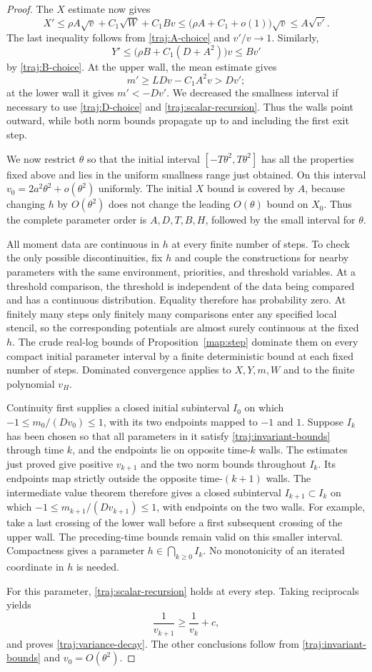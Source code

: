 \begin{proof}
The $X$ estimate now gives
\[
 X'\le\rho A\sqrt v+C_1\sqrt W+C_1Bv
     \le\bigl(\rho A+C_1+o(1)\bigr)\sqrt v
     \le A\sqrt{v'}.
\]
The last inequality follows from \eqref{traj:A-choice} and
$v'/v\to1$.  Similarly,
\[
 Y'\le\bigl(\rho B+C_1(D+A^2)\bigr)v\le Bv'
\]
by \eqref{traj:B-choice}.  At the upper wall, the mean estimate gives
\[
 m'\ge LDv-C_1A^2v>Dv';
\]
at the lower wall it gives $m'<-Dv'$.  We decreased the smallness
interval if necessary to use \eqref{traj:D-choice} and
\eqref{traj:scalar-recursion}.  Thus the walls point outward, while
both norm bounds propagate up to and including the first exit step.

We now restrict $\theta$ so that the initial interval
$[-T\theta^2,T\theta^2]$ has all the properties fixed above and
lies in the uniform smallness range just obtained.  On this interval
$v_0=2a^2\theta^2+o(\theta^2)$ uniformly.  The initial $X$ bound is
covered by $A$, because changing $h$ by $O(\theta^2)$ does not change
the leading $O(\theta)$ bound on $X_0$.  Thus the complete parameter
order is $A,D,T,B,H$, followed by the small interval for $\theta$.

All moment data are continuous in $h$ at every finite number of
steps.  To check the only possible discontinuities, fix $h$ and
couple the constructions for nearby parameters with the same
environment, priorities, and threshold variables.  At a threshold
comparison, the threshold is independent of the data being compared
and has a continuous distribution.  Equality therefore has probability
zero.  At finitely many steps only finitely many comparisons enter
any specified local stencil, so the corresponding potentials are
almost surely continuous at the fixed $h$.  The crude real-log bounds
of Proposition~\ref{map:step} dominate them on every compact initial
parameter interval by a finite deterministic bound at each fixed
number of steps.  Dominated convergence applies to $X,Y,m,W$ and to
the finite polynomial $v_H$.

Continuity first supplies a closed initial subinterval $I_0$ on which
$-1\le m_0/(Dv_0)\le1$, with its two endpoints mapped to $-1$ and
$1$.  Suppose $I_k$ has been chosen so that all parameters in it
satisfy \eqref{traj:invariant-bounds} through time $k$, and the
endpoints lie on opposite time-$k$ walls.  The estimates just proved
give positive $v_{k+1}$ and the two norm bounds throughout $I_k$.
Its endpoints map strictly outside the opposite time-$(k+1)$ walls.
The intermediate value theorem therefore gives a closed subinterval
$I_{k+1}\subset I_k$ on which
$-1\le m_{k+1}/(Dv_{k+1})\le1$, with endpoints on the two walls.
For example, take a last crossing of the lower wall before a first
subsequent crossing of the upper wall.  The preceding-time bounds
remain valid on this smaller interval.  Compactness gives a parameter
$h\in\bigcap_{k\ge0}I_k$.  No monotonicity of an iterated coordinate
in $h$ is needed.

For this parameter, \eqref{traj:scalar-recursion} holds at every
step.  Taking reciprocals yields
\[
 \frac1{v_{k+1}}\ge\frac1{v_k}+c,
\]
and proves \eqref{traj:variance-decay}.  The other conclusions follow
from \eqref{traj:invariant-bounds} and $v_0=O(\theta^2)$.
\end{proof}

